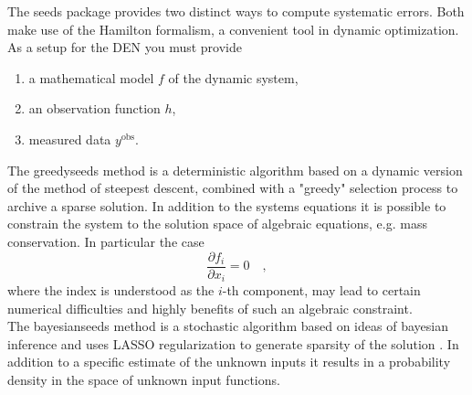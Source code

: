 The \textsf{seeds} package provides two distinct ways to compute systematic errors. Both make 
use of the Hamilton formalism, a convenient tool in dynamic optimization. 
As a setup for the DEN you must provide
\begin{enumerate}
	\item a mathematical model $f$ of the dynamic system,
	\item an observation function $h$,
	\item measured data $y^\text{obs}$. 
\end{enumerate}
The \textsf{greedyseeds} method is a deterministic algorithm based on a dynamic version of the 
method of steepest descent, combined with a "greedy" selection process to archive a sparse 
solution. In addition to the systems equations it is possible to constrain the system to the 
solution space of algebraic equations, e.g. mass conservation. In particular the case
\begin{equation}
	\frac{\partial f_i}{\partial x_i} = 0 \quad ,
\end{equation} 
where the index is understood as the $i$-th component, may lead to certain numerical 
difficulties and highly benefits of such an algebraic constraint.
\\

The \textsf{bayesianseeds} method is a stochastic algorithm based on ideas of bayesian 
inference and uses LASSO regularization to generate sparsity of the solution \cite{BDEN}. 
In addition to 
a specific estimate of the unknown inputs it results in a probability density in the 
space of unknown input functions.
